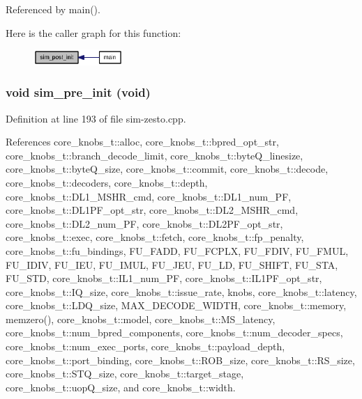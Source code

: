 Referenced by main().

Here is the caller graph for this function:\nopagebreak
\begin{figure}[H]
\begin{center}
\leavevmode
\includegraphics[width=96pt]{sim-zesto_8cpp_7af633ff74aee8f90ea9a610892191ce_icgraph}
\end{center}
\end{figure}
\subsubsection[{sim\_\-pre\_\-init}]{\setlength{\rightskip}{0pt plus 5cm}void sim\_\-pre\_\-init (void)}\label{sim-zesto_8cpp_6f8bfcc0d1d039d6fb378af082656f6f}




Definition at line 193 of file sim-zesto.cpp.

References core\_\-knobs\_\-t::alloc, core\_\-knobs\_\-t::bpred\_\-opt\_\-str, core\_\-knobs\_\-t::branch\_\-decode\_\-limit, core\_\-knobs\_\-t::byteQ\_\-linesize, core\_\-knobs\_\-t::byteQ\_\-size, core\_\-knobs\_\-t::commit, core\_\-knobs\_\-t::decode, core\_\-knobs\_\-t::decoders, core\_\-knobs\_\-t::depth, core\_\-knobs\_\-t::DL1\_\-MSHR\_\-cmd, core\_\-knobs\_\-t::DL1\_\-num\_\-PF, core\_\-knobs\_\-t::DL1PF\_\-opt\_\-str, core\_\-knobs\_\-t::DL2\_\-MSHR\_\-cmd, core\_\-knobs\_\-t::DL2\_\-num\_\-PF, core\_\-knobs\_\-t::DL2PF\_\-opt\_\-str, core\_\-knobs\_\-t::exec, core\_\-knobs\_\-t::fetch, core\_\-knobs\_\-t::fp\_\-penalty, core\_\-knobs\_\-t::fu\_\-bindings, FU\_\-FADD, FU\_\-FCPLX, FU\_\-FDIV, FU\_\-FMUL, FU\_\-IDIV, FU\_\-IEU, FU\_\-IMUL, FU\_\-JEU, FU\_\-LD, FU\_\-SHIFT, FU\_\-STA, FU\_\-STD, core\_\-knobs\_\-t::IL1\_\-num\_\-PF, core\_\-knobs\_\-t::IL1PF\_\-opt\_\-str, core\_\-knobs\_\-t::IQ\_\-size, core\_\-knobs\_\-t::issue\_\-rate, knobs, core\_\-knobs\_\-t::latency, core\_\-knobs\_\-t::LDQ\_\-size, MAX\_\-DECODE\_\-WIDTH, core\_\-knobs\_\-t::memory, memzero(), core\_\-knobs\_\-t::model, core\_\-knobs\_\-t::MS\_\-latency, core\_\-knobs\_\-t::num\_\-bpred\_\-components, core\_\-knobs\_\-t::num\_\-decoder\_\-specs, core\_\-knobs\_\-t::num\_\-exec\_\-ports, core\_\-knobs\_\-t::payload\_\-depth, core\_\-knobs\_\-t::port\_\-binding, core\_\-knobs\_\-t::ROB\_\-size, core\_\-knobs\_\-t::RS\_\-size, core\_\-knobs\_\-t::STQ\_\-size, core\_\-knobs\_\-t::target\_\-stage, core\_\-knobs\_\-t::uopQ\_\-size, and core\_\-knobs\_\-t::width.

